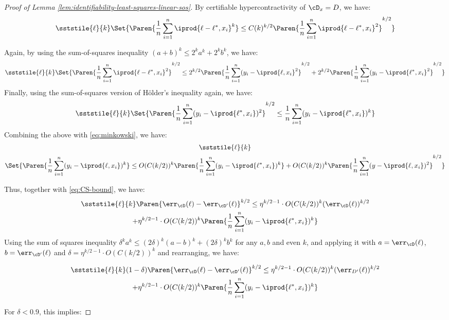 \begin{proof}[Proof of Lemma \ref{lem:identifiability-least-squares-linear-sos}]
By certifiable hypercontractivity of $\cD_x = D$, we have:
\[
\sststile{\ell}{k} \Set{\Paren{ \frac{1}{n} \sum_{i =1}^n \iprod{\ell-\ell^{*},x_i}^{k}} \leq C(k)^{k/2} \Paren{ \frac{1}{n} \sum_{i =1}^n \iprod{\ell-\ell^{*},x_i}^2}^{k/2}} 
\]

Again, by using the sum-of-squares inequality $(a+b)^k \leq 2^k a^k + 2^k b^k$, we have:
\[
\sststile{\ell}{k} \Set{\Paren{ \frac{1}{n} \sum_{i =1}^n \iprod{\ell-\ell^{*},x_i}^2}^{k/2} \leq 2^{k/2}\Paren{ \frac{1}{n} \sum_{i =1}^n (y_i-\iprod{\ell,x_i}^2}^{k/2} + 2^{k/2}\Paren{ \frac{1}{n} \sum_{i =1}^n (y_i-\iprod{\ell^{*},x_i}^2}^{k/2}  } 
\]
Finally, using the sum-of-squares version of H\"older's inequality again, we have:
\[
\sststile{\ell}{k} \Set{\Paren{ \frac{1}{n} \sum_{i =1}^n (y_i-\iprod{\ell^{*},x_i})^2}^{k/2} \leq  \frac{1}{n} \sum_{i =1}^n (y_i-\iprod{\ell^{*},x_i})^k   } 
\]
Combining the above with \eqref{eq:minkowski}, we have:
\begin{multline}
\sststile{\ell}{k}\\ \Set{\Paren{ \frac{1}{n} \sum_{i =1}^n (y_i-\iprod{\ell,x_i})^{k}} \leq O(C(k/2))^{k} \Paren{ \frac{1}{n} \sum_{i =1}^n (y_i-\iprod{\ell^{*},x_i})^{k}} + O(C(k/2))^{k}\Paren{ \frac{1}{n} \sum_{i =1}^n (y-\iprod{\ell,x_i})^2}^{k/2}} 
\end{multline}

Thus, together with \eqref{eq:CS-bound},  we have:
\begin{multline}
\sststile{\ell}{k} \Paren{\err_{\cD}(\ell) - \err_{\cD'}(\ell)}^{k/2}  \leq \eta^{k/2-1} \cdot O(C(k/2))^{k} (\err_{\cD}(\ell))^{k/2} \\+ \eta^{k/2-1} \cdot O(C(k/2))^{k} \Paren{ \frac{1}{n} \sum_{i =1}^n (y_i-\iprod{\ell^{*},x_i})^{k}}  
\end{multline}
Using the sum of squares inequality $\delta^k a^k \leq (2\delta)^k (a-b)^k + (2\delta)^k b^k$ for any $a,b$ and even $k$, and applying it with $a = \err_{\cD}(\ell)$, $b = \err_{\cD'}(\ell)$ and $\delta = \eta^{k/2-1} \cdot O(C(k/2))^{k}$ and rearranging, we have:

\begin{multline}
\sststile{\ell}{k}  (1-\delta) \Paren{\err_{\cD}(\ell) - \err_{\cD'}(\ell)}^{k/2}  \leq \eta^{k/2-1} \cdot O(C(k/2))^{k} (\err_{D'}(\ell))^{k/2} \\+ \eta^{k/2-1} \cdot O(C(k/2))^{k} \Paren{ \frac{1}{n} \sum_{i =1}^n (y_i-\iprod{\ell^{*},x_i})^{k}} 
\end{multline}

For $\delta < 0.9$, this implies:



\end{proof}

